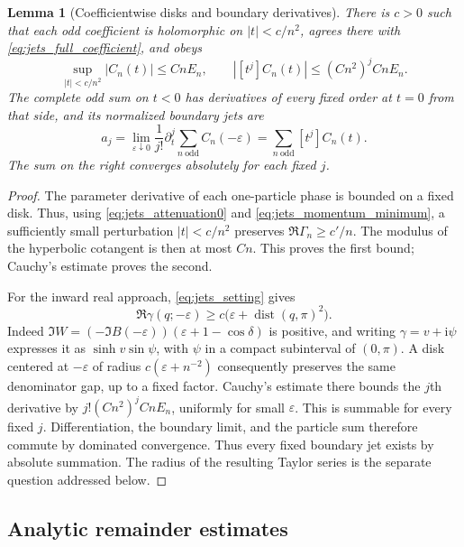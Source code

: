 \documentclass[11pt]{article}
\numberwithin{equation}{section}
\newtheorem{lemma}[theorem]{Lemma}
\theoremstyle{definition}
\newcommand{\ii}{\mathrm i}
\newcommand{\eps}{\varepsilon}
\newcommand{\dist}{\operatorname{dist}}
\begin{document}
\begin{lemma}[Coefficientwise disks and boundary derivatives]
\label{lem:jets_boundary_derivatives}
There is $c>0$ such that each odd coefficient is holomorphic on
$|t|<c/n^2$, agrees there with \eqref{eq:jets_full_coefficient}, and
obeys
\begin{equation}\label{eq:jets_small_disk}
 \sup_{|t|<c/n^2}|C_n(t)|\le CnE_n,
 \qquad |[t^j]C_n(t)|\le (Cn^2)^j CnE_n.
\end{equation}
The complete odd sum on $t<0$ has derivatives of every fixed order at
$t=0$ from that side, and its normalized boundary jets are
\begin{equation}\label{eq:jets_boundary_coefficients}
 a_j=\lim_{\eps\downarrow0}\frac1{j!}
       \partial_t^j\sum_{n\ \mathrm{odd}}C_n(-\eps)
     =\sum_{n\ \mathrm{odd}}[t^j]C_n(t).
\end{equation}
The sum on the right converges absolutely for each fixed $j$.
\end{lemma}

\begin{proof}
The parameter derivative of each one-particle phase is bounded on a
fixed disk. Thus, using \eqref{eq:jets_attenuation0} and
\eqref{eq:jets_momentum_minimum}, a sufficiently small perturbation
$|t|<c/n^2$ preserves $\Re\Gamma_n\ge c'/n$. The modulus of the
hyperbolic cotangent is then at most $Cn$. This proves the first bound;
Cauchy's estimate proves the second.

For the inward real approach, \eqref{eq:jets_setting} gives
\[
 \Re\gamma(q;-\eps)\ge
 c\bigl(\eps+\dist(q,\pi)^2\bigr).
\]
Indeed $\Im W=(-\Im B(-\eps))(\eps+1-\cos\delta)$ is positive,
and writing $\gamma=v+\ii\psi$ expresses it as
$\sinh v\sin\psi$, with $\psi$ in a compact subinterval of
$(0,\pi)$. A disk centered at $-\eps$ of radius
$c(\eps+n^{-2})$ consequently preserves the same denominator gap,
up to a fixed factor. Cauchy's estimate there bounds the $j$th
derivative by $j!(Cn^2)^j CnE_n$, uniformly for small $\eps$.
This is summable for every fixed $j$. Differentiation, the boundary
limit, and the particle sum therefore commute by dominated
convergence. Thus every fixed boundary jet exists by absolute summation. The radius
of the resulting Taylor series is the separate question addressed below.
\end{proof}

\subsection{Analytic remainder estimates}
\end{document}

